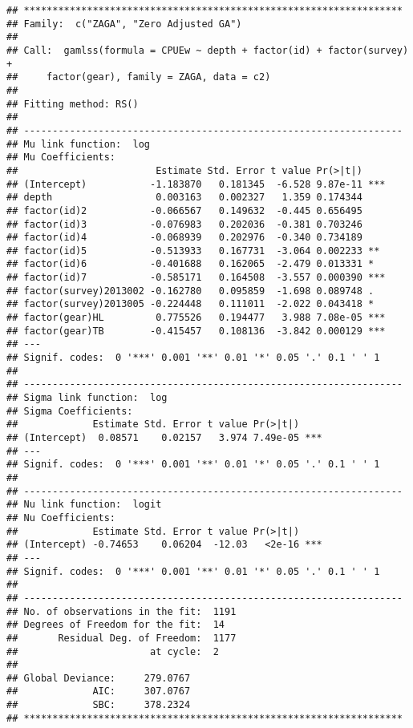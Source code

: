 \documentclass[]{article}
\begin{document}
\begin{verbatim}
## ******************************************************************
## Family:  c("ZAGA", "Zero Adjusted GA") 
## 
## Call:  gamlss(formula = CPUEw ~ depth + factor(id) + factor(survey) +  
##     factor(gear), family = ZAGA, data = c2) 
## 
## Fitting method: RS() 
## 
## ------------------------------------------------------------------
## Mu link function:  log
## Mu Coefficients:
##                        Estimate Std. Error t value Pr(>|t|)    
## (Intercept)           -1.183870   0.181345  -6.528 9.87e-11 ***
## depth                  0.003163   0.002327   1.359 0.174344    
## factor(id)2           -0.066567   0.149632  -0.445 0.656495    
## factor(id)3           -0.076983   0.202036  -0.381 0.703246    
## factor(id)4           -0.068939   0.202976  -0.340 0.734189    
## factor(id)5           -0.513933   0.167731  -3.064 0.002233 ** 
## factor(id)6           -0.401688   0.162065  -2.479 0.013331 *  
## factor(id)7           -0.585171   0.164508  -3.557 0.000390 ***
## factor(survey)2013002 -0.162780   0.095859  -1.698 0.089748 .  
## factor(survey)2013005 -0.224448   0.111011  -2.022 0.043418 *  
## factor(gear)HL         0.775526   0.194477   3.988 7.08e-05 ***
## factor(gear)TB        -0.415457   0.108136  -3.842 0.000129 ***
## ---
## Signif. codes:  0 '***' 0.001 '**' 0.01 '*' 0.05 '.' 0.1 ' ' 1
## 
## ------------------------------------------------------------------
## Sigma link function:  log
## Sigma Coefficients:
##             Estimate Std. Error t value Pr(>|t|)    
## (Intercept)  0.08571    0.02157   3.974 7.49e-05 ***
## ---
## Signif. codes:  0 '***' 0.001 '**' 0.01 '*' 0.05 '.' 0.1 ' ' 1
## 
## ------------------------------------------------------------------
## Nu link function:  logit 
## Nu Coefficients:
##             Estimate Std. Error t value Pr(>|t|)    
## (Intercept) -0.74653    0.06204  -12.03   <2e-16 ***
## ---
## Signif. codes:  0 '***' 0.001 '**' 0.01 '*' 0.05 '.' 0.1 ' ' 1
## 
## ------------------------------------------------------------------
## No. of observations in the fit:  1191 
## Degrees of Freedom for the fit:  14
##       Residual Deg. of Freedom:  1177 
##                       at cycle:  2 
##  
## Global Deviance:     279.0767 
##             AIC:     307.0767 
##             SBC:     378.2324 
## ******************************************************************
\end{verbatim}
\end{document}
